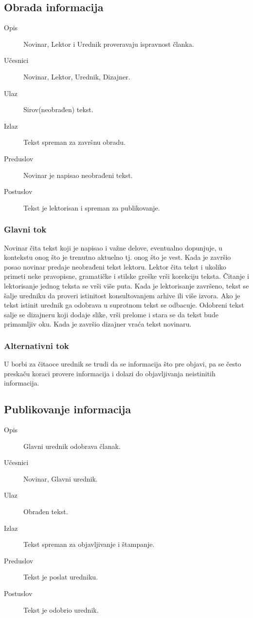 \subsection{Obrada informacija}
\begin{description}
\item [Opis] Novinar, Lektor i Urednik proveravaju ispravnost članka.
\item [Učesnici] Novinar, Lektor, Urednik, Dizajner.
\item [Ulaz] Sirov(neobrađen) tekst.
\item [Izlaz] Tekst spreman za završnu obradu.
\item [Preduslov] Novinar je napisao neobrađeni tekst.
\item [Postuslov] Tekst je lektorisan i spreman za publikovanje.
\end{description}      
\subsubsection{Glavni tok}
Novinar čita tekst koji je napisao i važne delove, eventualno dopunjuje, u kontekstu onog što je trenutno aktuelno tj. onog što je vest. Kada je završio posao novinar predaje neobrađeni tekst lektoru. Lektor čita tekst i ukoliko primeti neke pravopisne, gramatičke i stilske greške vrši korekciju teksta. Čitanje i lektorisanje jednog teksta se vrši više puta. Kada je lektorisanje završeno, tekst se šalje uredniku da proveri istinitost konsultovanjem arhive ili više izvora. Ako je tekst istinit urednik ga odobrava u suprotnom tekst se odbacuje. Odobreni tekst salje se dizajneru koji dodaje slike, vrši prelome i stara se da tekst bude primamljiv oku. Kada je završio dizajner vraća tekst novinaru.
\subsubsection{Alternativni tok}
U borbi za čitaoce urednik se trudi da se informacija što pre objavi, pa se često preskaču koraci provere informacija i dolazi do objavljivanja neistinitih informacija.

\subsection{Publikovanje informacija}
\begin{description}
\item [Opis] Glavni urednik odobrava članak.
\item [Učesnici] Novinar, Glavni urednik.
\item [Ulaz] Obrađen tekst.
\item [Izlaz] Tekst spreman za objavljivanje i štampanje.
\item [Preduslov] Tekst je poslat uredniku.
\item [Postuslov] Tekst je odobrio urednik.
\end{description}      
